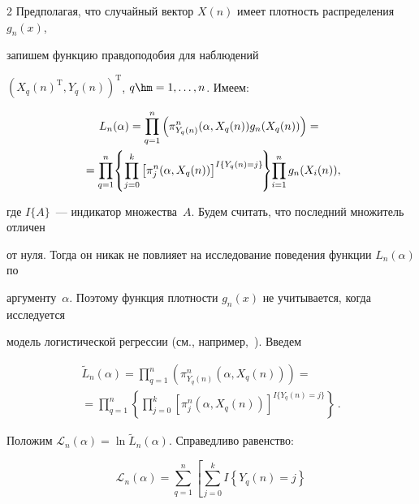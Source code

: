 \begin{multicols}{2}
Предполагая, что случайный вектор $X(n)$ имеет плотность распределения $g_n(x)$, 


запишем функцию правдоподобия для наблюдений 


$(X_q(n)^{\mathrm{T}},Y_q(n))^{\mathrm{T}}$, $q\hm=1,\ldots,n$. Имеем:


\begin{multline*}


L_n(\alpha)=\prod\limits_{q=1}^{n}\left(\pi^n_{Y_q(n)}(\alpha,X_q(n))g_n(X_q(n))\right)={}\\


\hspace*{-2pt}{}=


\prod\limits_{q=1}^n\!\left\{\prod\limits_{j=0}^k\left[\pi^n_{j}(\alpha ,X_q(n))\right]^{I\{Y_q(n)=


j\}}\!\right\}\!\prod\limits_{i=1}^ng_n(X_i(n)),\hspace*{-4.07253pt}


\end{multline*}


где $I\{A\}$~--- индикатор множества~$A$. Будем считать, что последний множитель отличен 


от нуля. Тогда он никак не повлияет на исследование поведения функции $L_n(\alpha)$ по 


аргументу~$\alpha$. Поэтому функция плотности $g_n(x)$ не учитывается, когда исследуется 


модель логистической регрессии (см., например,~\cite{Gramacy}). Введем


\begin{multline*}


\widetilde{L}_n(\alpha)=\prod\limits_{q=1}^{n}


\left(\pi^n_{Y_q(n)}(\alpha, X_q(n))\right)={}\\


{}=


\prod\limits_{q=1}^n\left\{\prod\limits_{j=0}^k\left[\pi^n_{j}(\alpha, X_q(n))\right]^{I\{Y_q(n)


=j\}}\right\}\,.


\end{multline*}


Положим $\mathcal{L}_n(\alpha)=\ln \widetilde{L}_n(\alpha)$. Справедливо равенство:


\begin{equation*}


\mathcal{L}_n(\alpha)=\sum\limits_{q=1}^n\left[\sum\limits_{j=0}^k I\left\{Y_q(n)=j\right\}



\end{equation*}
\end{multicols}
